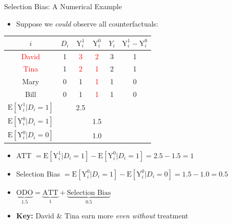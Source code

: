 \documentclass[hyperref={pdfpagelabels=false}]{beamer}
\begin{document}
\begin{frame}{Selection Bias: A Numerical Example}
	\begin{itemize}
		\item Suppose we \emph{could} observe all counterfactuals:
	\end{itemize}
	\vspace{0.05cm}
	\begin{center}
		\begin{threeparttable}
			\centering\footnotesize
			\begin{tabular}{cccccc}
				\toprule
				$i$ & $D_i$ & $\mathrm{Y}^{1}_{i}$ & $\mathrm{Y}^{0}_{i}$ & $Y_i$ & $\mathrm{Y}^{1}_{i}-\mathrm{Y}^{0}_{i}$ \\
				\midrule
				\textcolor{red}{David} & 1 & \textcolor{red}{3} & \textcolor{red}{2} & 3 & 1 \\
				\textcolor{red}{Tina}  & 1 & \textcolor{red}{2} & \textcolor{red}{1} & 2 & 1 \\
				Mary  & 0 & 1 & \textcolor{red}{1} & 1 & 0 \\
				Bill  & 0 & 1 & \textcolor{red}{1} & 1 & 0 \\
				\midrule
				$\mathrm{E}[\mathrm{Y}^{1}_{i}|D_i=1]$ & & 2.5 & & & \\
				$\mathrm{E}[\mathrm{Y}^{0}_{i}|D_i=1]$ & & & 1.5 & & \\
				$\mathrm{E}[\mathrm{Y}^{0}_{i}|D_i=0]$ & & & 1.0 & & \\
				\bottomrule
			\end{tabular}
		\end{threeparttable}
	\end{center}
	\vspace{0.1cm}
	\begin{itemize}
		\item ATT $= \mathrm{E}[\mathrm{Y}^{1}_{i}|D_i=1] - \mathrm{E}[\mathrm{Y}^{0}_{i}|D_i=1] = 2.5 - 1.5 = 1$
		\vspace{0.1cm}
		\item Selection Bias $= \mathrm{E}[\mathrm{Y}^{0}_{i}|D_i=1] - \mathrm{E}[\mathrm{Y}^{0}_{i}|D_i=0] = 1.5 - 1.0 = 0.5$
		\vspace{0.1cm}
		\item[$\Rightarrow$] $\underbrace{\text{ODO}}_{1.5} = \underbrace{\text{ATT}}_{1} + \underbrace{\text{Selection Bias}}_{0.5}$
		\vspace{0.1cm}
		\item \textbf{Key:} David \& Tina earn more \emph{even without} treatment
	\end{itemize}
\end{frame}
\end{document}
